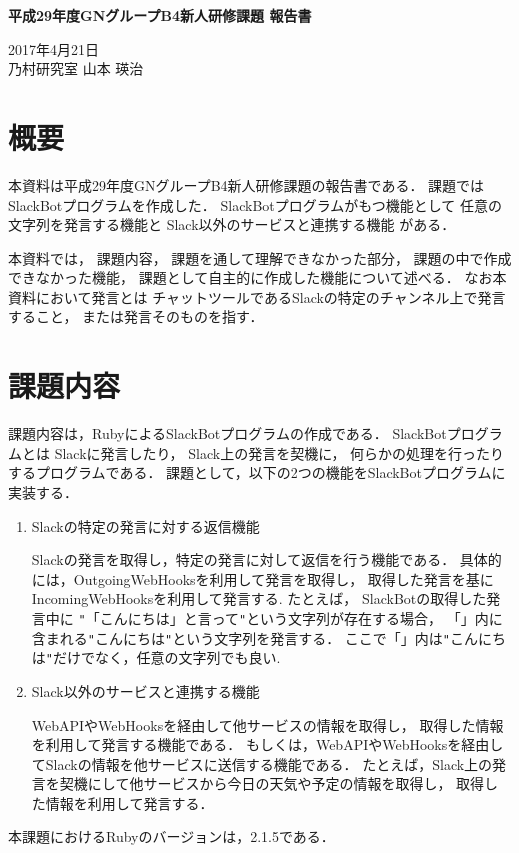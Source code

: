 \documentclass[fleqn, 14pt]{extarticlej}
\begin{document}
\begin{center}
{\Large {\bf 平成29年度GNグループB4新人研修課題 報告書}}

\end{center}
\begin{flushright}
2017年4月21日\\

乃村研究室 山本 瑛治
\end{flushright}

\section{概要}
本資料は平成29年度GNグループB4新人研修課題の報告書である．
課題ではSlackBotプログラムを作成した．
SlackBotプログラムがもつ機能として
任意の文字列を発言する機能と
Slack以外のサービスと連携する機能
がある．

本資料では，
課題内容，
課題を通して理解できなかった部分，
課題の中で作成できなかった機能，
課題として自主的に作成した機能について述べる．
なお本資料において発言とは
チャットツールであるSlack\cite{Slack}の特定のチャンネル上で発言すること，
または発言そのものを指す．

\section{課題内容}
課題内容は，RubyによるSlackBotプログラムの作成である．
SlackBotプログラムとは
Slackに発言したり，
Slack上の発言を契機に，
何らかの処理を行ったりするプログラムである．
課題として，以下の2つの機能をSlackBotプログラムに実装する．

\begin{enumerate}
\item Slackの特定の発言に対する返信機能

  Slackの発言を取得し，特定の発言に対して返信を行う機能である．
  具体的には，OutgoingWebHooksを利用して発言を取得し，
  取得した発言を基に
  IncomingWebHooksを利用して発言する.
  たとえば，
  SlackBotの取得した発言中に
  \verb|"|「こんにちは」と言って\verb|"|という文字列が存在する場合，
  「」内に含まれる\verb|"|こんにちは\verb|"|という文字列を発言する．
  ここで「」内は\verb|"|こんにちは\verb|"|だけでなく，任意の文字列でも良い.
\item Slack以外のサービスと連携する機能

  WebAPIやWebHooksを経由して他サービスの情報を取得し，
  取得した情報を利用して発言する機能である．
  もしくは，WebAPIやWebHooksを経由してSlackの情報を他サービスに送信する機能である．
  たとえば，Slack上の発言を契機にして他サービスから今日の天気や予定の情報を取得し，
  取得した情報を利用して発言する．
\end{enumerate}
本課題におけるRubyのバージョンは，2.1.5である．
\end{document}
